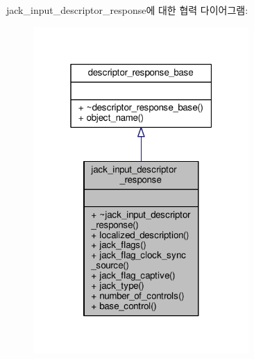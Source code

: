 jack\+\_\+input\+\_\+descriptor\+\_\+response에 대한 협력 다이어그램\+:
\nopagebreak
\begin{figure}[H]
\begin{center}
\leavevmode
\includegraphics[width=232pt]{classavdecc__lib_1_1jack__input__descriptor__response__coll__graph}
\end{center}
\end{figure}
